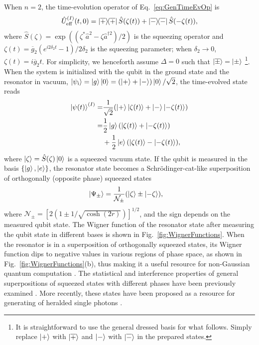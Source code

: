 When $n=2$, the time-evolution operator of Eq.~\eqref{eq:GenTimeEvOp} is
\begin{align}\label{eq:QCSTimeOp}
    \hat{U}_{\text{eff}}^{(I)}(t,0)=\dyad{\overline{+}}\hat{S}(\zeta(t))+\dyad{\overline{-}}\hat{S}(-\zeta(t)),
\end{align}
where $\hat{S}(\zeta)=\exp((\zeta^* \hat{a}^2-\zeta \hat{a}^{\dagger 2})/2)$ is the squeezing operator and $\zeta(t)=\overline{g}_2(e^{i2\delta_2 t}-1)/2\delta_2$ is the squeezing parameter; when $\delta_2\rightarrow0$, $\zeta(t)=i\overline{g}_2t$. For simplicity, we henceforth assume $\Delta=0$ such that $\ket{\overline{\pm}}=\ket{\pm}$ \footnote{It is straightforward to use the general dressed basis for what follows. Simply replace $\ket{+}$ with $\ket{\overline{+}}$ and $\ket{-}$ with $\ket{\overline{-}}$ in the prepared states.}. When the system is initialized with the qubit in the ground state and the resonator in vacuum, $\ket{\psi_{\text{i}}}=\ket{g}\ket{0}=(\ket{+}+\ket{-})\ket{0}/\sqrt{2}$, the time-evolved state reads
\begin{align}\label{eq:TimeEvSt}
    \ket{\psi(t)}^{(I)}=&\frac{1}{\sqrt{2}}(\ket{+}\ket{\zeta(t)}+\ket{-}\ket{-\zeta(t)})\nonumber\\ =&\frac{1}{2}\ket{g}(\ket{\zeta(t)}+\ket{-\zeta(t)})\nonumber \\&+\frac{1}{2}\ket{e}(\ket{\zeta(t)}-\ket{-\zeta(t)}),
\end{align}
where $\ket{\zeta}=\hat{S}(\zeta)\ket{0}$ is a squeezed vacuum state.
If the qubit is measured in the basis $\{\ket{g},\ket{e}\}$, the resonator state becomes a Schr\"odinger-cat-like superposition of orthogonally (opposite phase) squeezed states \begin{align}
    \ket{\Psi_\pm}&=\frac{1}{\mathcal{N_{\pm}}}(\ket{\zeta}\pm \ket{-\zeta}),
\end{align}
where $\mathcal{N}_\pm = \left[2(1\pm 1/\sqrt{\cosh(2r)})\right]^{1/2}$, and the sign depends on the measured qubit state. The Wigner function of the resonator state after measuring the qubit state in different bases is shown in Fig.~\ref{fig:WignerFunctions}. When the resonator is in a superposition of orthogonally squeezed states, its Wigner function dips to negative values in various regions of phase space, as shown in Fig.~\ref{fig:WignerFunctions}(b), thus making it a useful resource for non-Gaussian quantum computation \cite{ResourceWignerNeg}. The statistical and interference properties of general superpositions of squeezed states with different phases have been previously examined \cite{BCSanders_SqueezedSuperposition}. More recently, these states have been proposed as a resource for generating of heralded single photons \cite{azuma2024heralded}.
